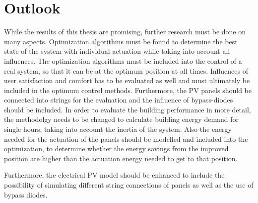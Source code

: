\chapter{Outlook}
\label{ch:outlook}

While the results of this thesis are promising, further research must be done on many aspects. Optimization algorithms must be found to determine the best state of the system with individual actuation while taking into account all influences. The optimization algorithms must be included into the control of a real system, so that it can be at the optimum position at all times. Influences of user satisfaction and comfort has to be evaluated as well and must ultimately be included in the optimum control methods. Furthermore, the PV panels should be connected into strings for the evaluation and the influence of bypass-diodes should be included. In order to evaluate the building performance in more detail, the methodolgy needs to be changed to calculate building energy demand for single hours, taking into account the inertia of the system. Also the energy needed for the actuation of the panels should be modelled and included into the optimization, to determine whether the energy savings from the improved position are higher than the actuation energy needed to get to that position. 

Furthermore, the electrical PV model should be enhanced to include the possibility of simulating different string connections of panels as well as the use of bypass diodes. 